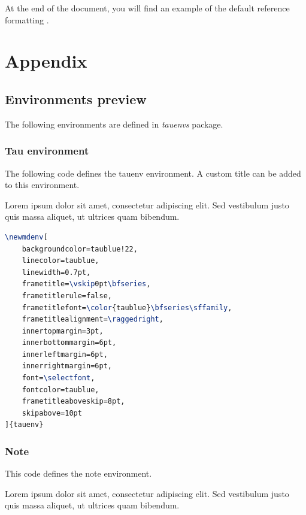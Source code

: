 \documentclass[9pt,a4paper,twoside]{tau}
\begin{document}
    At the end of the document, you will find an example of the default reference formatting \cite{dirac}.
        
\section{Appendix}

    \subsection{Environments preview}

        The following environments are defined in \textit{tauenvs} package.
		
		\subsubsection{Tau environment}

                The following code defines the tauenv environment. A custom title can be added to this environment.

			\begin{tauenv}[frametitle=Tauenv]
                    Lorem ipsum dolor sit amet, consectetur adipiscing elit. Sed vestibulum justo quis massa aliquet, ut ultrices quam bibendum.
			\end{tauenv}
		
\begin{lstlisting}[language=TeX, caption=Tauenv environment code.]
\newmdenv[
	backgroundcolor=taublue!22, 					
	linecolor=taublue,									
	linewidth=0.7pt,
	frametitle=\vskip0pt\bfseries,
	frametitlerule=false,
	frametitlefont=\color{taublue}\bfseries\sffamily,
	frametitlealignment=\raggedright,
	innertopmargin=3pt,
	innerbottommargin=6pt,
	innerleftmargin=6pt,
	innerrightmargin=6pt,
	font=\selectfont,
	fontcolor=taublue,									
	frametitleaboveskip=8pt,
	skipabove=10pt
]{tauenv} \end{lstlisting}
		
		\subsubsection{Note}

                This code defines the note environment.

  			\begin{note}
                    Lorem ipsum dolor sit amet, consectetur adipiscing elit. Sed vestibulum justo quis massa aliquet, ut ultrices quam bibendum.
			\end{note}
		
\end{document}
